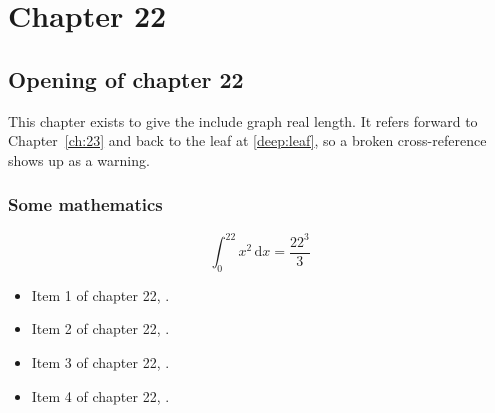\chapter{Chapter 22}
\label{ch:22}
\section{Opening of chapter 22}
This chapter exists to give the include graph real length. It refers
forward to Chapter~\ref{ch:23} and back to the leaf
at \ref{deep:leaf}, so a broken cross-reference shows up as a warning.

\subsection{Some mathematics}
\begin{equation}
  \int_0^{22} x^{2} \, \mathrm{d}x = \frac{22^{3}}{3}
\end{equation}

\begin{itemize}
  \item Item 1 of chapter 22, .
  \item Item 2 of chapter 22, .
  \item Item 3 of chapter 22, .
  \item Item 4 of chapter 22, .
\end{itemize}

